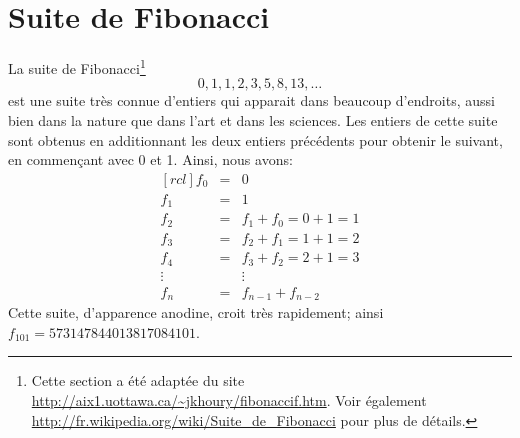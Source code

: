 \section{Suite de Fibonacci}

La suite de Fibonacci\footnote{Cette section a été adaptée du site \url{http://aix1.uottawa.ca/~jkhoury/fibonaccif.htm}.
Voir également \url{http://fr.wikipedia.org/wiki/Suite_de_Fibonacci} pour plus de détails.}
\[
0, 1, 1, 2, 3, 5, 8, 13, \ldots 
\]
est une suite très connue d'entiers qui apparait dans beaucoup d'endroits, aussi bien dans la nature que dans
l'art et dans les sciences.  Les entiers de cette suite sont obtenus en additionnant les deux entiers
précédents pour obtenir le suivant, en commençant avec 0 et 1.  Ainsi, nous avons:
\[
\begin{matrix}[rcl]
f_0 &=& 0 \\
f_1 &=& 1 \\
f_2 &=& f_1 + f_0 = 0 + 1 = 1 \\
f_3 &=& f_2 + f_1 = 1 + 1 = 2 \\
f_4 &=& f_3 + f_2 = 2 + 1 = 3 \\
\vdots && \vdots \\
f_n &=& f_{n-1} + f_{n-2}
\end{matrix}
\]
Cette suite, d'apparence anodine, croit très rapidement; ainsi $f_{101} = 573147844013817084101$.

